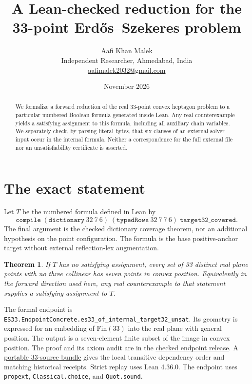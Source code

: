 \documentclass[11pt,letterpaper]{article}
\title{A Lean-checked reduction for the 33-point Erd\H{o}s--Szekeres problem}
\author{Aafi Khan Malek\\\small Independent Researcher, Ahmedabad, India\\
\small\href{mailto:aafimalek2032@gmail.com}{aafimalek2032@gmail.com}}
\date{November 2026}
\newtheorem{theorem}{Theorem}
\begin{document}
\maketitle

\begin{abstract}
We formalize a forward reduction of the real 33-point convex heptagon
problem to a particular numbered Boolean formula generated inside Lean.
Any real counterexample yields a satisfying assignment to this formula,
including all auxiliary chain variables. We separately check, by parsing
literal bytes, that six clauses of an external solver input occur in the
internal formula. Neither a correspondence for the full external file nor
an unsatisfiability certificate is asserted.
\end{abstract}

\section*{The exact statement}
Let \(T\) be the numbered formula defined in Lean by
\[
  \mathtt{compile}\;(\mathtt{dictionary}\ 32\ 7\ 6)\;
                 (\mathtt{typedRows}\ 32\ 7\ 7\ 6)\;
                 \mathtt{target32\_covered}.
\]
The final argument is the checked dictionary coverage theorem, not an
additional hypothesis on the point configuration. The formula is the
base positive-anchor target without external reflection-lex augmentation.

\begin{theorem}
If \(T\) has no satisfying assignment, every set of 33 distinct real plane
points with no three collinear has seven points in convex position.
Equivalently in the forward direction used here, any real counterexample
to that statement supplies a satisfying assignment to \(T\).
\end{theorem}

The formal endpoint is
\texttt{ES33.EndpointConcrete.es33\_of\_internal\_target32\_unsat}.
Its geometry is expressed for an embedding of \(\mathrm{Fin}(33)\) into the
real plane with general position. The output is a seven-element finite
subset of the image in convex position. The proof and its axiom audit are
in the \href{https://github.com/Aafimalek/novel-discoveries/tree/e8b089e7a3f484553d2b2660e30779ded0e83e04/erdos-szekeres-33/verification/lean-end-to-end-internal-target-reduction}{checked endpoint release}.
A \href{https://github.com/Aafimalek/novel-discoveries/tree/57e521a334d4078ee36acf7fd8d1b78b4a9f9411/erdos-szekeres-33/verification/lean-end-to-end-internal-target-reduction/portable}{portable
33-source bundle} gives the local transitive dependency order and matching
historical receipts. Strict replay uses Lean 4.36.0. The endpoint uses
\texttt{propext}, \texttt{Classical.choice}, and \texttt{Quot.sound}.
\end{document}
